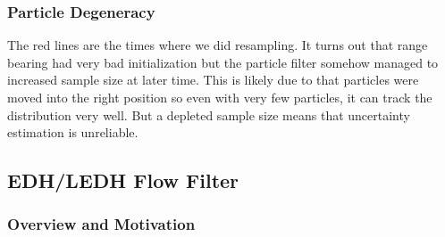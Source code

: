 \documentclass{article}
\begin{document}
\subsubsection{Particle Degeneracy}




The red lines are the times where we did resampling. It turns out that range bearing had very bad initialization but the particle filter somehow managed to increased sample size at later time. This is likely due to that particles were moved into the right position so even with very few particles, it can track the distribution very well. But a depleted sample size means that uncertainty estimation is unreliable. 




\subsection{EDH/LEDH Flow Filter}


\subsubsection{Overview and Motivation}
\end{document}
